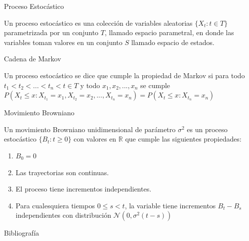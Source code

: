 



    \begin{frame}[plain]
        \titlepage
    \end{frame}
    \begin{frame}{Proceso Estocástico}
        \begin{definition}
            Un proceso estocástico es una colección de variables aleatorias $\{X_t : t\in T\}$ parametrizada por un conjunto $T$, llamado espacio parametral, en donde las variables toman valores en un conjunto $S$ llamado espacio de estados.
        \end{definition}
    \end{frame}
    \begin{frame}{Cadena de Markov}
        \begin{definition}
            Un proceso estocástico se dice que cumple la propiedad de Markov si para todo $t_1<t_2<...<t_n<t \in T$ y todo $x_1,x_2,...,x_n$ se cumple $P(X_t\leq x : X_{t_1}=x_1, X_{t_2}=x_2, ..., X_{t_n}=x_n) = P(X_t\leq x : X_{t_n}=x_n)$
        \end{definition}
    \end{frame}
    \begin{frame}{Movimiento Browniano}
        \begin{definition}
        Un movimiento Browniano unidimensional de parámetro $\sigma^2$ es un proceso estocástico $\{B_t : t\geq 0\}$ con valores en $\mathbb{R}$ que cumple las siguientes propiedades:
        \begin{enumerate}
            \item $B_0=0$
            \item Las trayectorias son continuas.
            \item El proceso tiene incrementos independientes.
            \item Para cualesquiera tiempos $0\leq s<t$, la variable tiene incrementos $B_t-B_s$ independientes con distribución $\mathcal{N}(0,\sigma^2(t-s))$
        \end{enumerate}
        \end{definition}
    \end{frame}
    \begin{frame}{Bibliografía}
        
        
    \end{frame}


    
